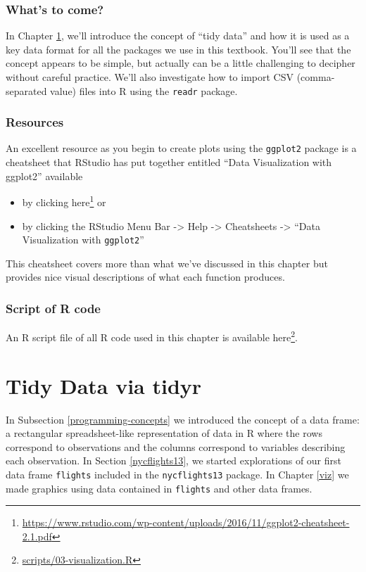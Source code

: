 \documentclass[12pt,]{krantz}
\providecommand{\tightlist}{%
  \setlength{\itemsep}{0pt}\setlength{\parskip}{0pt}}
\renewcommand{\href}[2]{#2\footnote{\url{#1}}}
\theoremstyle{definition}
\theoremstyle{definition}
\theoremstyle{definition}
\theoremstyle{remark}
\begin{document}
\subsection{What's to come?}\label{whats-to-come-1}

In Chapter \ref{tidy}, we'll introduce the concept of ``tidy data'' and
how it is used as a key data format for all the packages we use in this
textbook. You'll see that the concept appears to be simple, but actually
can be a little challenging to decipher without careful practice. We'll
also investigate how to import CSV (comma-separated value) files into R
using the \texttt{readr} package.

\subsection{Resources}\label{resources}

An excellent resource as you begin to create plots using the
\texttt{ggplot2} package is a cheatsheet that RStudio has put together
entitled ``Data Visualization with ggplot2'' available

\begin{itemize}
\tightlist
\item
  by clicking
  \href{https://www.rstudio.com/wp-content/uploads/2016/11/ggplot2-cheatsheet-2.1.pdf}{here}
  or
\item
  by clicking the RStudio Menu Bar -\textgreater{} Help -\textgreater{}
  Cheatsheets -\textgreater{} ``Data Visualization with
  \texttt{ggplot2}''
\end{itemize}

This cheatsheet covers more than what we've discussed in this chapter
but provides nice visual descriptions of what each function produces.

\subsection{Script of R code}\label{script-of-r-code}

An R script file of all R code used in this chapter is available
\href{scripts/03-visualization.R}{here}.

\chapter{Tidy Data via tidyr}\label{tidy}

In Subsection \ref{programming-concepts} we introduced the concept of a
data frame: a rectangular spreadsheet-like representation of data in R
where the rows correspond to observations and the columns correspond to
variables describing each observation. In Section \ref{nycflights13}, we
started explorations of our first data frame \texttt{flights} included
in the \texttt{nycflights13} package. In Chapter \ref{viz} we made
graphics using data contained in \texttt{flights} and other data frames.
\end{document}
